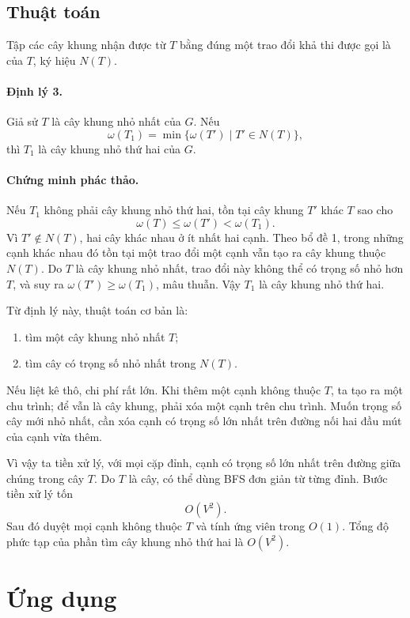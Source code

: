 \documentclass[11pt]{article}
\begin{document}
\subsection{Thuật toán}

Tập các cây khung nhận được từ $T$ bằng đúng một trao đổi khả thi được gọi là
 của $T$, ký hiệu $N(T)$.

\paragraph{Định lý 3.}
Giả sử $T$ là cây khung nhỏ nhất của $G$. Nếu
\[
  \omega(T_1)=\min\{\omega(T')\mid T'\in N(T)\},
\]
thì $T_1$ là cây khung nhỏ thứ hai của $G$.

\paragraph{Chứng minh phác thảo.}
Nếu $T_1$ không phải cây khung nhỏ thứ hai, tồn tại cây khung $T'$ khác $T$
sao cho
\[
  \omega(T)\le \omega(T')<\omega(T_1).
\]
Vì $T'\notin N(T)$, hai cây khác nhau ở ít nhất hai cạnh. Theo bổ đề 1, trong
những cạnh khác nhau đó tồn tại một trao đổi một cạnh vẫn tạo ra cây khung
thuộc $N(T)$. Do $T$ là cây khung nhỏ nhất, trao đổi này không thể có trọng số
nhỏ hơn $T$, và suy ra $\omega(T')\ge \omega(T_1)$, mâu thuẫn. Vậy $T_1$ là
cây khung nhỏ thứ hai.

Từ định lý này, thuật toán cơ bản là:
\begin{enumerate}
  \item tìm một cây khung nhỏ nhất $T$;
  \item tìm cây có trọng số nhỏ nhất trong $N(T)$.
\end{enumerate}
Nếu liệt kê thô, chi phí rất lớn. Khi thêm một cạnh không thuộc $T$, ta tạo ra
một chu trình; để vẫn là cây khung, phải xóa một cạnh trên chu trình. Muốn
trọng số cây mới nhỏ nhất, cần xóa cạnh có trọng số lớn nhất trên đường nối
hai đầu mút của cạnh vừa thêm.

Vì vậy ta tiền xử lý, với mọi cặp đỉnh, cạnh có trọng số lớn nhất trên đường
giữa chúng trong cây $T$. Do $T$ là cây, có thể dùng BFS đơn giản từ từng
đỉnh. Bước tiền xử lý tốn
\[
  O(V^2).
\]
Sau đó duyệt mọi cạnh không thuộc $T$ và tính ứng viên trong $O(1)$. Tổng độ
phức tạp của phần tìm cây khung nhỏ thứ hai là $O(V^2)$.

\section{Ứng dụng}
\end{document}
